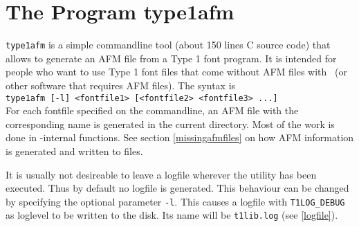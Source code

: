 
\newpage
\section{The Program {\ttfamily type1afm}}
\label{type1afm}%
\verb+type1afm+ is a simple commandline tool (about 150 lines C source
code) that allows to generate an AFM file from a Type 1 font
program. It is intended for people who want to use Type 1 font files
that come without AFM files with \tonelib\ (or other software that
requires AFM files). The syntax is \\[0.5cm]
\verb+type1afm [-l] <fontfile1> [<fontfile2> <fontfile3> ...] +\\[0.5cm]
For each fontfile specified on the commandline, an AFM file with the
corresponding name is generated in the current directory.
Most of the work is done in \tonelib-internal functions. See section
\ref{missingafmfiles} on how AFM information is generated and written
to files.

It is usually not desireable to leave a logfile wherever the utility
has been executed. Thus by default no logfile is generated. This
behaviour can be changed by specifying the optional parameter
\verb+-l+. This causes a logfile with \verb+T1LOG_DEBUG+ as loglevel
to be written to the disk. Its name will be \verb+t1lib.log+ (see
\ref{logfile}). 


